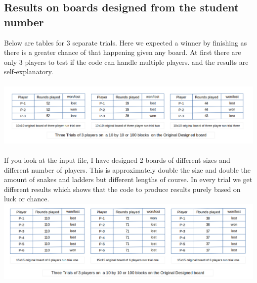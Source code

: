 \subsection*{Results on boards designed from the student number}
Below are tables for 3 separate trials. Here we expected a winner by finishing as there is a greater chance of that happening given any board. At first there are only 3 players to test if the code can handle multiple players. and the results are self-explanatory.\\ \\
\includegraphics[scale=0.5]{threeOrig.png}\\\\
If you look at the input file, I have designed 2 boards of different sizes and different number of players. This is approximately double the size and double the amount of snakes and ladders but different lengths of course. In every trial we get different results which shows that the code to produce results purely based on luck or chance.\\
\includegraphics[scale=0.5]{sixOrig.png}\\

